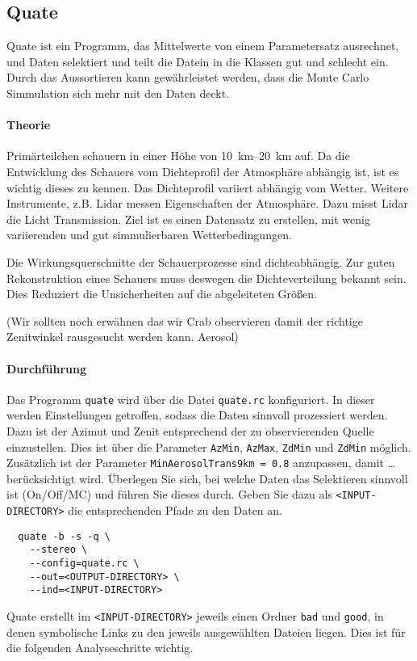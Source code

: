 \subsection{Quate}%
\label{sub:quate}

Quate ist ein Programm,
das Mittelwerte von einem Parametersatz ausrechnet,
und Daten selektiert und teilt die Datein in die Klassen gut und schlecht ein.
Durch das Aussortieren kann gewährleistet werden, 
dass die Monte Carlo Simmulation sich mehr mit den Daten deckt. 

\paragraph{Theorie}%
Primärteilchen schauern in einer Höhe von \SIrange{10}{20}{\kilo\meter}
auf.
Da die Entwicklung des Schauers vom Dichteprofil der Atmosphäre abhängig ist, 
ist es wichtig dieses zu kennen. 
Das Dichteprofil variiert abhängig vom Wetter. 
Weitere Instrumente, z.B. Lidar messen Eigenschaften der Atmosphäre.
Dazu misst Lidar die Licht Transmission.
Ziel ist es einen Datensatz zu erstellen,
mit wenig variierenden und gut simmulierbaren Wetterbedingungen.

Die Wirkungsquerschnitte der Schauerprozesse sind dichteabhängig.
Zur guten Rekonstruktion eines Schauers muss deswegen die Dichteverteilung
bekannt sein.
Dies Reduziert die Unsicherheiten auf die abgeleiteten Größen. 

{\color{red}(Wir sollten noch erwähnen das wir Crab observieren damit der
richtige Zenitwinkel rausgesucht werden kann. Aerosol)}

\paragraph{Durchführung}%
Das Programm \texttt{quate} wird über die
Datei \texttt{quate.rc} konfiguriert.
In dieser werden Einstellungen getroffen,
sodass die Daten sinnvoll prozessiert werden.
Dazu ist der Azimut und Zenit entsprechend der zu
observierenden Quelle einzustellen.
Dies ist über die Parameter \texttt{AzMin},
\texttt{AzMax}, \texttt{ZdMin} und \texttt{ZdMin}
möglich.
Zusätzlich ist der Parameter
\texttt{MinAerosolTrans9km = 0.8} anzupassen,
damit {\color{red}\ldots} berücksichtigt wird.
Überlegen Sie sich,
bei welche Daten das Selektieren sinnvoll ist
(On/Off/MC)
und führen Sie dieses durch.
Geben Sie dazu als \texttt{<INPUT-DIRECTORY>} die entsprechenden Pfade zu den Daten an.

\begin{lstlisting}
  quate -b -s -q \
    --stereo \
    --config=quate.rc \
    --out=<OUTPUT-DIRECTORY> \
    --ind=<INPUT-DIRECTORY>
\end{lstlisting}
Quate erstellt im \texttt{<INPUT-DIRECTORY>}
jeweils einen Ordner \texttt{bad} und \texttt{good},
in denen symbolische Links zu den jeweils ausgewählten Dateien liegen.
Dies ist für die folgenden Analyseschritte wichtig.
